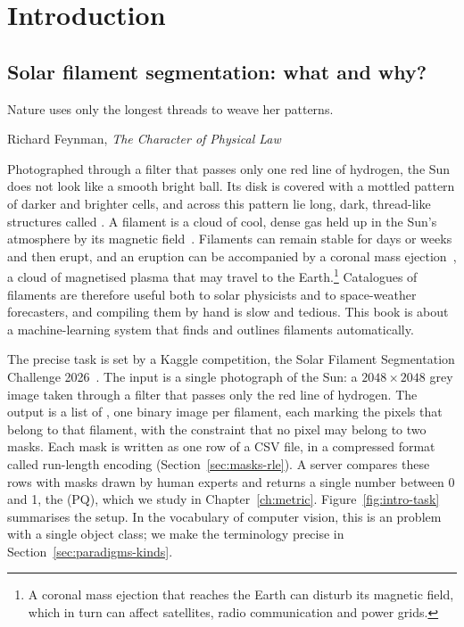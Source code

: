 \chapter{Introduction}\label{ch:intro}

\section{Solar filament segmentation: what and why?}\label{sec:intro-what}
\epigraph{Nature uses only the longest threads to weave her patterns.}{Richard Feynman,
\emph{The Character of Physical Law} \citeyearpar{feynman1965}}

Photographed through a filter that passes only one red line of hydrogen, the Sun does not look
like a smooth bright ball. Its disk is covered with a mottled pattern of darker and brighter
cells, and across this pattern lie long, dark, thread-like structures called . A filament is a cloud of cool, dense gas held up in the Sun's atmosphere by its
magnetic field~\citep{mackay2010,parenti2014}. Filaments can remain stable for days or weeks and
then erupt, and an eruption can be accompanied by a coronal mass ejection~\citep{webb2012}, a
cloud of magnetised plasma that may travel to the Earth.\footnote{A coronal mass ejection that reaches the Earth can disturb its magnetic field,
which in turn can affect satellites, radio communication and power grids.} Catalogues of filaments are therefore useful both to solar physicists and to
space-weather forecasters, and compiling them by hand is slow and tedious. This book is about a
machine-learning system that finds and outlines filaments automatically.

The precise task is set by a Kaggle competition, the Solar Filament Segmentation Challenge
2026~\citep{challenge}. The input is a single photograph of the Sun: a $2048\times2048$ grey
image taken through a filter that passes only the red \Ha{} line of hydrogen. The output is a
list of , one binary image per filament, each marking the pixels that
belong to that filament, with the constraint that no pixel may belong to two masks. Each mask is
written as one row of a CSV file, in a compressed format called run-length encoding
(Section~\ref{sec:masks-rle}). A server compares these rows with masks drawn by human experts and
returns a single number between 0 and 1, the  (PQ), which we study in
Chapter~\ref{ch:metric}. Figure~\ref{fig:intro-task} summarises the setup. In the vocabulary of
computer vision, this is an  problem with a single object class;
we make the terminology precise in Section~\ref{sec:paradigms-kinds}.

